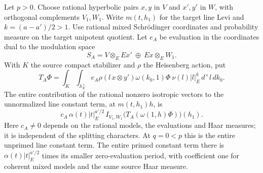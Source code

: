 \begin{proposition}\label{threal:coneA}
Let \(p>0\). Choose rational hyperbolic pairs \(x,y\) in \(V\)
and \(x',y'\) in \(W\), with orthogonal complements \(V_1,W_1\).
Write \(m(t,h_1)\) for the target line Levi and \(k=(a-a')/2>1\).
Use rational mixed Schr\"odinger coordinates and probability
measure on the target unipotent quotient. Let \(e_A\) be evaluation
in the coordinates dual to the modulation space
\[
        S_A= V\otimes_E Ex'\ \oplus\ Ex\otimes_E W_1.
\]
With \(K\) the source compact stabilizer and \(\rho\) the Heisenberg
action, put
\[
 T_A\Phi=\int_K\int_{\mathbb A_E^\times}
  e_A\rho(l\,x\otimes y')\omega(k_0,1)\Phi\
             \nu(l)|l|_E^k\,d^\times l\,dk_0 .
\]
The entire contribution of the rational nonzero isotropic vectors
to the unnormalized line constant term, at \(m(t,h_1)h\), is
\[
   c_A\,\alpha(t)|t|_E^{a'/2}\,
      I_{V_1,W_1}\big(T_A(\omega(1,h)\Phi)\big)(h_1).
\]
Here \(c_A\ne0\) depends on the rational models, the evaluations
and Haar measures; it is independent of the splitting characters.
At \(q=0<p\) this is the entire unprimed line constant term.
The entire primed constant term there is
\(\alpha(t)|t|_E^{a'/2}\) times its smaller zero-evaluation
period, with coefficient one for coherent mixed models and the same
source Haar measure.
\end{proposition}
